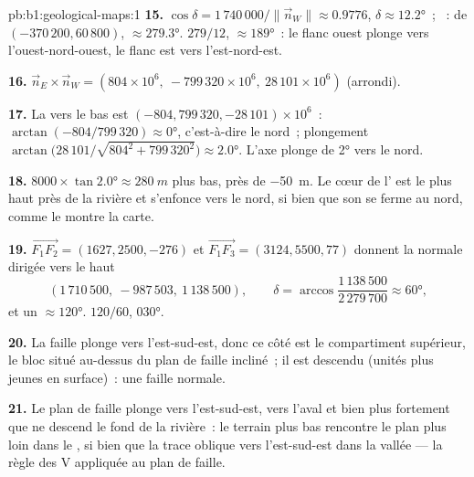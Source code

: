 \begin{solution}{pb:b1:geological-maps:1}
\textbf{15.} $\cos\delta = 1\,740\,000/\|\vec n_W\| \approx 0.9776$, $\delta
\approx \ang{12.2}$~; ~:  de $(-370\,200, 60\,800)$,
$\approx \ang{279.3}$.  $279/12$,  $\approx \ang{189}$~: le
flanc ouest plonge vers l'ouest-nord-ouest, le flanc est vers l'est-nord-est.

\textbf{16.} $\vec n_E \times \vec n_W = (804 \times 10^6,\ -799\,320 \times
10^6,\ 28\,101 \times 10^6)$ (arrondi).

\textbf{17.} La  vers le bas est $(-804, 799\,320, -28\,101) \times
10^6$~:  $\arctan(-804/799\,320) \approx \ang{0}$, c'est-à-dire le nord~;
plongement
$\arctan\bigl(28\,101/\sqrt{804^2 + 799\,320^2}\bigr) \approx \ang{2.0}$. L'axe
plonge de \ang{2} vers le nord.

\textbf{18.} $8000 \times \tan\ang{2.0} \approx \qty{280}{m}$ plus bas, près de
\qty{-50}{m}. Le cœur de l' est le plus haut près de la rivière et
s'enfonce vers le nord, si bien que son  se ferme au nord, comme le
montre la carte.

\textbf{19.} $\overrightarrow{F_1F_2} = (1627, 2500, -276)$ et
$\overrightarrow{F_1F_3} = (3124, 5500, 77)$ donnent la normale dirigée vers le haut
\[
  (1\,710\,500,\ -987\,503,\ 1\,138\,500), \qquad
  \delta = \arccos\frac{1\,138\,500}{2\,279\,700} \approx \ang{60},
\]
et un  $\approx \ang{120}$.  $120/60$, 
\ang{030}.

\textbf{20.} La faille plonge vers l'est-sud-est, donc ce côté est le
compartiment supérieur, le bloc situé au-dessus du plan de faille incliné~; il
est descendu (unités plus jeunes en surface)~: une faille normale.

\textbf{21.} Le plan de faille plonge vers l'est-sud-est, vers l'aval et bien
plus fortement que ne descend le fond de la rivière~: le terrain plus bas
rencontre le plan plus loin dans le , si bien que la trace oblique
vers l'est-sud-est dans la vallée --- la règle des V appliquée au plan de faille.


\end{solution}
